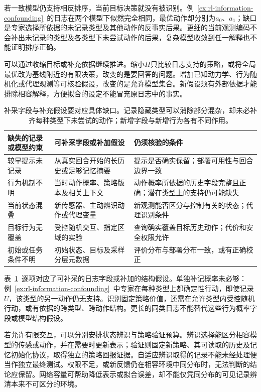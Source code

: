 若一致模型仍支持相反排序，当前目标决策就没有被识别。例~\ref{ex:rl-information-confounding}~的日志在两个模型下似然完全相同，最优动作却分别为$a_0$、$a_1$；缺口是专家选择所依据的未记录类型及其他动作的反事实后果。更细的当前观测编码不会补出未记录的类型及各类型下未尝试动作的后果，复杂模型收敛到任一解释也不能证明排序正确。

可以通过收缩目标或补充依据继续推进。缩小$\Pi$只比较日志支持的策略，或将全局最优改为基线附近的有限决策，改变的是要回答的问题。增加已知动力学、行为随机化或代理观测等可核验假设，改变的是允许模型集合。新假设须有外部依据才能排除相容解释，方便拟合的设定不能冒充原日志中的事实。

\begin{table}[htbp]
  \centering
  \small
  \begin{tabularx}{\linewidth}{p{26mm}XX}
    \toprule
    缺失的记录或模型约束 & 可补采字段或补加假设 & 仍须核验的条件 \\
    \midrule
    较早提示未记录 & 从真实回合开始的长历史或足够记忆摘要 & 提示是否确实保留；部署可用性与回合边界一致 \\
    行为机制不明 & 当时动作概率、策略版本及相关上下文 & 动作概率所依据的历史字段完整且正确；潜在类型上的支持仍可能缺失 \\
    当前状态混叠 & 新传感器、主动辨识动作或代理变量 & 新观测能否区分与控制有关的状态；代理识别条件 \\
    目标行为无覆盖 & 受控随机交互、指定区域的实验 & 查询确实覆盖目标历史动作；代价和安全权限允许 \\
    初始或任务条件不明 & 初始状态、目标及采样分层元数据 & 评价分布与部署分布一致，或有正确校正 \\
    \bottomrule
  \end{tabularx}
  \caption{补采字段与补充假设要对应具体缺口。记录隐藏类型可以消除部分混杂，却未必补齐每种类型下未尝试的动作；新增字段与新增行为各有不同作用。}
  \label{tab:rl-information-information-repair}
\end{table}

表~\ref{tab:rl-information-information-repair}~逐项对应了可补采的日志字段或补加的结构假设。单独补记概率未必够：例~\ref{ex:rl-information-confounding}~中专家在每种类型上都确定性行动，即使记录$U$，该类型的另一动作仍无支持。识别固定策略价值，还需在允许类型内受控随机行动，或有依据的跨类型、跨动作结构。更长的同类日志不能替代这些行为概率字段或模型结构假设。

若允许有限交互，可以分别安排状态辨识与策略验证预算。辨识选择能区分相容模型的传感或动作，并在需要时更新表示；验证则固定新策略、其可读取的历史及记忆初始化协议，取得独立的策略回报证据。自适应辨识取得的记录不能未经处理便当作独立最终测试。权限不足，或新反馈仍在相容环境中同分布时，无法判断的结论应保留。网络容量可帮助降低表示或拟合误差，却不能仅凭同分布的可见记录辨清本来不可区分的环境。

